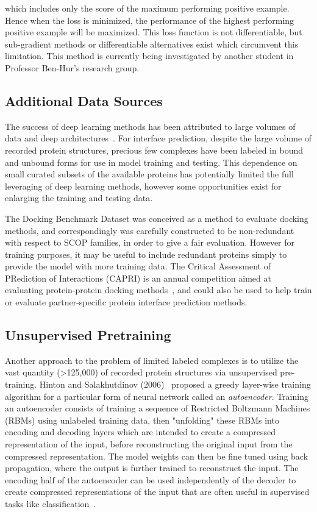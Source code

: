 \noindent
which includes only the score of the maximum performing positive example.
Hence when the loss is minimized, the performance of the highest performing positive example will be maximized.
This loss function is not differentiable, but sub-gradient methods or differentiable alternatives exist which circumvent this limitation.
This method is currently being investigated by another student in Professor Ben-Hur's research group.

\subsection{Additional Data Sources}

The success of deep learning methods has been attributed to large volumes of data and deep architectures~\cite{krizhevsky2012}.
For interface prediction, despite the large volume of recorded protein structures, precious few complexes have been labeled in bound and unbound forms for use in model training and testing. 
This dependence on small curated subsets of the available proteins has potentially limited the full leveraging of deep learning methods, however some opportunities exist for enlarging the training and testing data.

The Docking Benchmark Dataset was conceived as a method to evaluate docking methods, and correspondingly was carefully constructed to be non-redundant with respect to SCOP families, in order to give a fair evaluation.
However for training purposes, it may be useful to include redundant proteins simply to provide the model with more training data. 
The Critical Assessment of PRediction of Interactions (CAPRI) is an annual competition aimed at evaluating protein-protein docking methods~\cite{janin2003}, and could also be used to help train or evaluate partner-specific protein interface prediction methods. 

\subsection{Unsupervised Pretraining}

Another approach to the problem of limited labeled complexes is to utilize the vast quantity (>125,000) of recorded protein structures via unsupervised pre-training.
Hinton and Salakhutdinov (2006)~\cite{hinton2006b} proposed a greedy layer-wise training algorithm for a particular form of neural network called an \emph{autoencoder}.
Training an autoencoder consists of training a sequence of Restricted Boltzmann Machines (RBMs) using unlabeled training data, then "unfolding" these RBMs into encoding and decoding layers which are intended to create a compressed representation of the input, before reconstructing the original input from the compressed representation.
The model weights can then be fine tuned using back propagation, where the output is further trained to reconstruct the input.
The encoding half of the autoencoder can be used independently of the decoder to create compressed representations of the input that are often useful in supervised tasks like classification~\cite{hinton2006b, bengio2007}.

